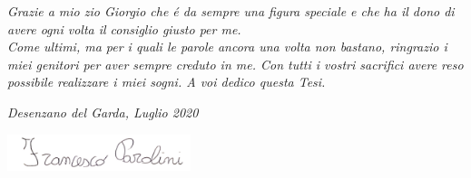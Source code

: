 \emph{Grazie a mio zio Giorgio che é da sempre una figura speciale e che ha il dono di
avere ogni volta il consiglio giusto per me.}\\

\textit{Come ultimi, ma per i quali le parole ancora una volta non bastano, ringrazio i miei genitori per aver sempre creduto in me.
Con tutti i vostri sacrifici avere reso possibile realizzare i miei sogni.
A voi dedico questa Tesi.}\\

\bigskip

\noindent\textit{Desenzano del Garda, Luglio 2020}
\hfill

\flushright\includegraphics[width=0.4\textwidth]{img/firma.png}

\endgroup
